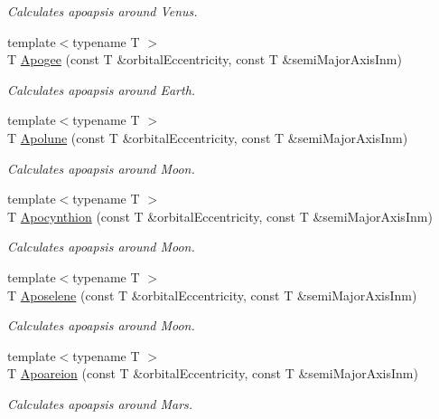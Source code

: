 \begin{DoxyCompactItemize}
\begin{DoxyCompactList}\small\item\em Calculates apoapsis around Venus. \end{DoxyCompactList}\item 
{\footnotesize template$<$typename T $>$ }\\T \mbox{\hyperlink{group___e_g_x_phys-_apoapsis_ga5bb3b3a83de372ffaf9af3ab77d6f408}{Apogee}} (const T \&orbital\+Eccentricity, const T \&semi\+Major\+Axis\+Inm)
\begin{DoxyCompactList}\small\item\em Calculates apoapsis around Earth. \end{DoxyCompactList}\item 
{\footnotesize template$<$typename T $>$ }\\T \mbox{\hyperlink{group___e_g_x_phys-_apoapsis_gac82e5aebcf63e5113ddefe648f40ef2e}{Apolune}} (const T \&orbital\+Eccentricity, const T \&semi\+Major\+Axis\+Inm)
\begin{DoxyCompactList}\small\item\em Calculates apoapsis around Moon. \end{DoxyCompactList}\item 
{\footnotesize template$<$typename T $>$ }\\T \mbox{\hyperlink{group___e_g_x_phys-_apoapsis_ga44b6d3e3280b5a59e1cfb53b65673075}{Apocynthion}} (const T \&orbital\+Eccentricity, const T \&semi\+Major\+Axis\+Inm)
\begin{DoxyCompactList}\small\item\em Calculates apoapsis around Moon. \end{DoxyCompactList}\item 
{\footnotesize template$<$typename T $>$ }\\T \mbox{\hyperlink{group___e_g_x_phys-_apoapsis_gaf13528a3ed48f6e85f4ba5735edc1163}{Aposelene}} (const T \&orbital\+Eccentricity, const T \&semi\+Major\+Axis\+Inm)
\begin{DoxyCompactList}\small\item\em Calculates apoapsis around Moon. \end{DoxyCompactList}\item 
{\footnotesize template$<$typename T $>$ }\\T \mbox{\hyperlink{group___e_g_x_phys-_apoapsis_ga8a44d21df90f3e6e9168b871a5b7f26b}{Apoareion}} (const T \&orbital\+Eccentricity, const T \&semi\+Major\+Axis\+Inm)
\begin{DoxyCompactList}\small\item\em Calculates apoapsis around Mars. \end{DoxyCompactList}\item 

\end{DoxyCompactItemize}
